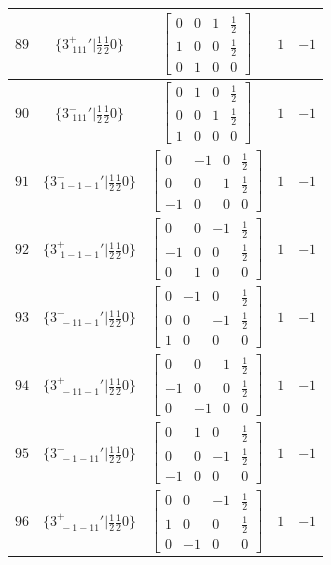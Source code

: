 \documentclass[fleqn,8pt]{jsarticle}
\begin{document}
\begin{longtable}{ccccc}
$ 89 $ & $ \{3^{+}_{\,\,111}{}'|\frac{1}{2} \frac{1}{2} 0\} $ & $ \begin{bmatrix} 0 & 0 & 1 & \frac{1}{2} \\ 1 & 0 & 0 & \frac{1}{2} \\ 0 & 1 & 0 & 0 \end{bmatrix} $ & $ 1 $ & $ -1 $ \\ \hline
$ 90 $ & $ \{3^{-}_{\,\,111}{}'|\frac{1}{2} \frac{1}{2} 0\} $ & $ \begin{bmatrix} 0 & 1 & 0 & \frac{1}{2} \\ 0 & 0 & 1 & \frac{1}{2} \\ 1 & 0 & 0 & 0 \end{bmatrix} $ & $ 1 $ & $ -1 $ \\ \hline
$ 91 $ & $ \{3^{-}_{\,\,1-1-1}{}'|\frac{1}{2} \frac{1}{2} 0\} $ & $ \begin{bmatrix} 0 & -1 & 0 & \frac{1}{2} \\ 0 & 0 & 1 & \frac{1}{2} \\ -1 & 0 & 0 & 0 \end{bmatrix} $ & $ 1 $ & $ -1 $ \\ \hline
$ 92 $ & $ \{3^{+}_{\,\,1-1-1}{}'|\frac{1}{2} \frac{1}{2} 0\} $ & $ \begin{bmatrix} 0 & 0 & -1 & \frac{1}{2} \\ -1 & 0 & 0 & \frac{1}{2} \\ 0 & 1 & 0 & 0 \end{bmatrix} $ & $ 1 $ & $ -1 $ \\ \hline
$ 93 $ & $ \{3^{-}_{\,\,-11-1}{}'|\frac{1}{2} \frac{1}{2} 0\} $ & $ \begin{bmatrix} 0 & -1 & 0 & \frac{1}{2} \\ 0 & 0 & -1 & \frac{1}{2} \\ 1 & 0 & 0 & 0 \end{bmatrix} $ & $ 1 $ & $ -1 $ \\ \hline
$ 94 $ & $ \{3^{+}_{\,\,-11-1}{}'|\frac{1}{2} \frac{1}{2} 0\} $ & $ \begin{bmatrix} 0 & 0 & 1 & \frac{1}{2} \\ -1 & 0 & 0 & \frac{1}{2} \\ 0 & -1 & 0 & 0 \end{bmatrix} $ & $ 1 $ & $ -1 $ \\ \hline
$ 95 $ & $ \{3^{-}_{\,\,-1-11}{}'|\frac{1}{2} \frac{1}{2} 0\} $ & $ \begin{bmatrix} 0 & 1 & 0 & \frac{1}{2} \\ 0 & 0 & -1 & \frac{1}{2} \\ -1 & 0 & 0 & 0 \end{bmatrix} $ & $ 1 $ & $ -1 $ \\ \hline
$ 96 $ & $ \{3^{+}_{\,\,-1-11}{}'|\frac{1}{2} \frac{1}{2} 0\} $ & $ \begin{bmatrix} 0 & 0 & -1 & \frac{1}{2} \\ 1 & 0 & 0 & \frac{1}{2} \\ 0 & -1 & 0 & 0 \end{bmatrix} $ & $ 1 $ & $ -1 $ \\
\end{longtable}
\end{document}
